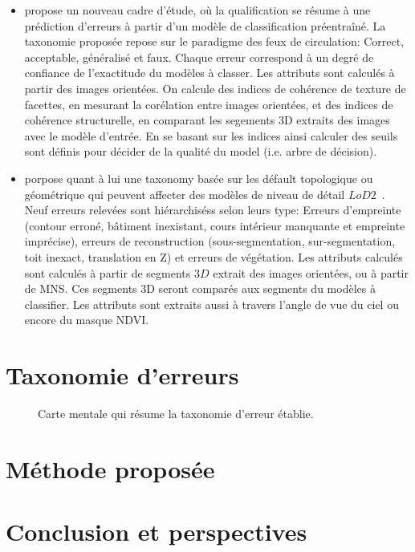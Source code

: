 \documentclass[a4paper,french]{article}
\begin{document}
    \begin{itemize}
        \item \cite{Boudet2006} propose un nouveau cadre d'étude, où la qualification se résume à une prédiction d'erreurs à partir d'un modèle de classification préentraîné. La taxonomie proposée repose sur le paradigme des feux de circulation: Correct, acceptable, généralisé et faux. Chaque erreur correspond à un degré de confiance de l'exactitude du modèles à classer. Les attributs sont calculés à partir des images orientées. On calcule des indices de cohérence de texture de facettes, en mesurant la corélation entre images orientées, et des indices de cohérence structurelle, en comparant les segements 3D extraits des images avec le modèle d'entrée. En se basant sur les indices ainsi calculer des seuils sont définis pour décider de la qualité du model (i.e. arbre de décision).
        \item \cite{Michelin2013} porpose quant à lui une taxonomy basée sur les défault topologique ou géométrique qui peuvent affecter des modèles de niveau de détail $LoD2$~\cite{kolbe2005citygml}. Neuf erreurs relevées sont hiérarchiséss selon leurs type: Erreurs d'empreinte (contour erroné, bâtiment inexistant, cours intérieur manquante et empreinte imprécise), erreurs de reconstruction (sous-segmentation, sur-segmentation, toit inexact, translation en Z) et erreurs de végétation. Les attributs calculés sont calculés à partir de segments $3D$ extrait des images orientées, ou à partir de MNS. Ces segments 3D seront comparés aux segments du modèles à classifier. Les attributs sont extraits aussi à travers l'angle de vue du ciel ou encore du masque NDVI.
    \end{itemize}

    \section{Taxonomie d'erreurs}

    \begin{figure}[h!]
        \begin{center}
            
            \caption{\label{fig::mindmap_errors} Carte mentale qui résume la taxonomie d'erreur établie.}
        \end{center}
    \end{figure}

    \section{Méthode proposée}
    \section{Conclusion et perspectives}

    
    
\end{document}

